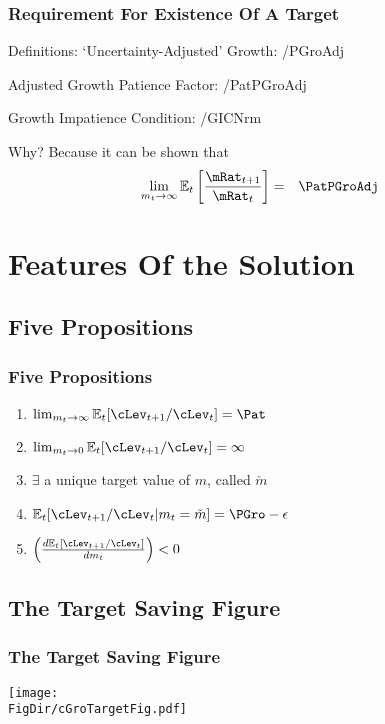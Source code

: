 \documentclass[pdflatex]{beamer}
\providecommand{\Ex}{\mathbb{E}}
\begin{document}
\begin{frame}
\frametitle{Requirement For Existence Of A Target}

Definitions: `Uncertainty-Adjusted' Growth:
 \LtxDir\EqDir/PGroAdj

Adjusted Growth Patience Factor:
 \LtxDir\EqDir/PatPGroAdj

Growth Impatience Condition:
 \LtxDir\EqDir/GICNrm~



Why?  Because it can be shown that
\begin{eqnarray}
 \lim_{m_{t} \rightarrow \infty} \Ex_{t}\left[\frac{\mRat_{t+1}}{\mRat_{t}}\right] & = & \PatPGroAdj  \label{eq:mGrowth}
\end{eqnarray}

\end{frame}

\section{Features Of the Solution}
\subsection{Five Propositions}
\begin{frame}
\frametitle{Five Propositions}

\begin{enumerate}
\item $\lim_{m_{t} \rightarrow \infty} \Ex_{t}[\cLev_{t+1}/\cLev_{t}] = \Pat$
\item $\lim_{m_{t} \rightarrow 0} \Ex_{t}[\cLev_{t+1}/\cLev_{t}] = \infty$
\item $\exists$ a unique target value of $m$, called $\check{m}$
\item $\Ex_{t}[\cLev_{t+1}/\cLev_{t} | m_{t} = \check{m}] = \PGro - \epsilon$
\item $\left(\frac{d \Ex_{t}[\cLev_{t+1}/\cLev_{t}]}{d m_{t}}\right) < 0$
\end{enumerate}

\end{frame}

\subsection{The Target Saving Figure}
\begin{frame}
\frametitle{The Target Saving Figure}
\centerline{\texttt{[image: \\FigDir/cGroTargetFig.pdf]}}
\end{frame}
\end{document}
